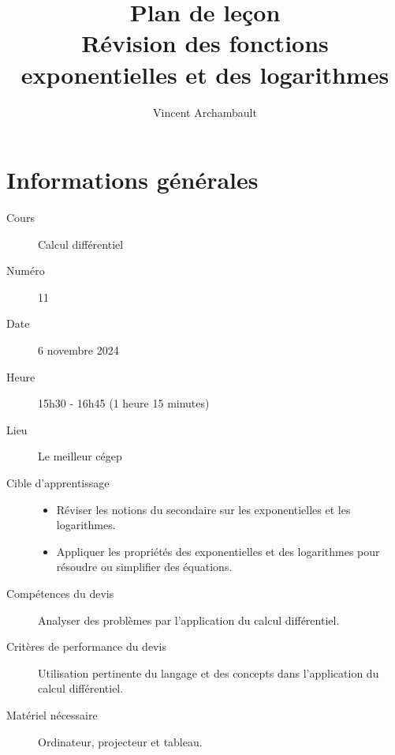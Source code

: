 \documentclass[12pt]{article}
\title{\sffamily Plan de leçon\\ Révision des fonctions exponentielles et des logarithmes}
\author{\sffamily Vincent Archambault}
\date{}
\begin{document}
\maketitle

\section*{Informations générales}
\begin{description}
\item[\faBook{} Cours] Calcul différentiel
\item[{\faHashtag} Numéro] 11
\item[{\faCalendar*[regular]} Date] 6 novembre 2024
\item[{\faClock[regular]} Heure] 15h30 - 16h45 (1 heure 15 minutes)
\item[\faLandmark{} Lieu] Le meilleur cégep
\item[\faBullseye{} Cible d'apprentissage]
\mbox{}\newline\leavevmode\vspace{-3ex}\begin{itemize}
    \item Réviser les notions du secondaire sur les exponentielles et les logarithmes.
    \item Appliquer les propriétés des exponentielles et des logarithmes pour résoudre ou simplifier des équations.
\end{itemize}
\item[\faToolbox{} Compétences du devis] Analyser des problèmes par l’application du calcul différentiel.
\item[\faUserCheck{} Critères de performance du devis] Utilisation pertinente du langage et des concepts dans l’application du calcul différentiel.
\item[\faTv{} Matériel nécessaire] Ordinateur, projecteur et tableau.
\end{description}

\clearpage
\end{document}
